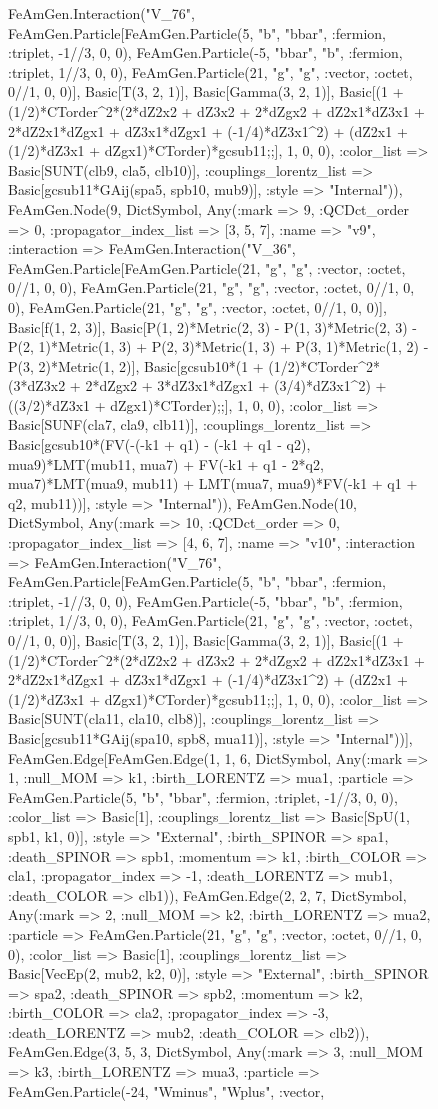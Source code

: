 \documentclass{revtex4}
\begin{document}
\begin{figure}[!htb]
\begin{center}
{FeAmGen.Interaction("V_76", FeAmGen.Particle[FeAmGen.Particle(5, "b", "bbar", :fermion, :triplet, -1//3, 0, 0), FeAmGen.Particle(-5, "bbar", "b", :fermion, :triplet, 1//3, 0, 0), FeAmGen.Particle(21, "g", "g", :vector, :octet, 0//1, 0, 0)], Basic[T(3, 2, 1)], Basic[Gamma(3, 2, 1)], Basic[(1 + (1/2)*CTorder^2*(2*dZ2x2 + dZ3x2 + 2*dZgx2 + dZ2x1*dZ3x1 + 2*dZ2x1*dZgx1 + dZ3x1*dZgx1 + (-1/4)*dZ3x1^2) + (dZ2x1 + (1/2)*dZ3x1 + dZgx1)*CTorder)*gcsub11;;], 1, 0, 0), :color_list => Basic[SUNT(clb9, cla5, clb10)], :couplings_lorentz_list => Basic[gcsub11*GAij(spa5, spb10, mub9)], :style => "Internal")), FeAmGen.Node(9, Dict{Symbol, Any}(:mark => 9, :QCDct_order => 0, :propagator_index_list => [3, 5, 7], :name => "v9", :interaction => FeAmGen.Interaction("V_36", FeAmGen.Particle[FeAmGen.Particle(21, "g", "g", :vector, :octet, 0//1, 0, 0), FeAmGen.Particle(21, "g", "g", :vector, :octet, 0//1, 0, 0), FeAmGen.Particle(21, "g", "g", :vector, :octet, 0//1, 0, 0)], Basic[f(1, 2, 3)], Basic[P(1, 2)*Metric(2, 3) - P(1, 3)*Metric(2, 3) - P(2, 1)*Metric(1, 3) + P(2, 3)*Metric(1, 3) + P(3, 1)*Metric(1, 2) - P(3, 2)*Metric(1, 2)], Basic[gcsub10*(1 + (1/2)*CTorder^2*(3*dZ3x2 + 2*dZgx2 + 3*dZ3x1*dZgx1 + (3/4)*dZ3x1^2) + ((3/2)*dZ3x1 + dZgx1)*CTorder);;], 1, 0, 0), :color_list => Basic[SUNF(cla7, cla9, clb11)], :couplings_lorentz_list => Basic[gcsub10*(FV(-(-k1 + q1) - (-k1 + q1 - q2), mua9)*LMT(mub11, mua7) + FV(-k1 + q1 - 2*q2, mua7)*LMT(mua9, mub11) + LMT(mua7, mua9)*FV(-k1 + q1 + q2, mub11))], :style => "Internal")), FeAmGen.Node(10, Dict{Symbol, Any}(:mark => 10, :QCDct_order => 0, :propagator_index_list => [4, 6, 7], :name => "v10", :interaction => FeAmGen.Interaction("V_76", FeAmGen.Particle[FeAmGen.Particle(5, "b", "bbar", :fermion, :triplet, -1//3, 0, 0), FeAmGen.Particle(-5, "bbar", "b", :fermion, :triplet, 1//3, 0, 0), FeAmGen.Particle(21, "g", "g", :vector, :octet, 0//1, 0, 0)], Basic[T(3, 2, 1)], Basic[Gamma(3, 2, 1)], Basic[(1 + (1/2)*CTorder^2*(2*dZ2x2 + dZ3x2 + 2*dZgx2 + dZ2x1*dZ3x1 + 2*dZ2x1*dZgx1 + dZ3x1*dZgx1 + (-1/4)*dZ3x1^2) + (dZ2x1 + (1/2)*dZ3x1 + dZgx1)*CTorder)*gcsub11;;], 1, 0, 0), :color_list => Basic[SUNT(cla11, cla10, clb8)], :couplings_lorentz_list => Basic[gcsub11*GAij(spa10, spb8, mua11)], :style => "Internal"))], FeAmGen.Edge[FeAmGen.Edge(1, 1, 6, Dict{Symbol, Any}(:mark => 1, :null_MOM => k1, :birth_LORENTZ => mua1, :particle => FeAmGen.Particle(5, "b", "bbar", :fermion, :triplet, -1//3, 0, 0), :color_list => Basic[1], :couplings_lorentz_list => Basic[SpU(1, spb1, k1, 0)], :style => "External", :birth_SPINOR => spa1, :death_SPINOR => spb1, :momentum => k1, :birth_COLOR => cla1, :propagator_index => -1, :death_LORENTZ => mub1, :death_COLOR => clb1)), FeAmGen.Edge(2, 2, 7, Dict{Symbol, Any}(:mark => 2, :null_MOM => k2, :birth_LORENTZ => mua2, :particle => FeAmGen.Particle(21, "g", "g", :vector, :octet, 0//1, 0, 0), :color_list => Basic[1], :couplings_lorentz_list => Basic[VecEp(2, mub2, k2, 0)], :style => "External", :birth_SPINOR => spa2, :death_SPINOR => spb2, :momentum => k2, :birth_COLOR => cla2, :propagator_index => -3, :death_LORENTZ => mub2, :death_COLOR => clb2)), FeAmGen.Edge(3, 5, 3, Dict{Symbol, Any}(:mark => 3, :null_MOM => k3, :birth_LORENTZ => mua3, :particle => FeAmGen.Particle(-24, "Wminus", "Wplus", :vector, }
\end{center}
\end{figure}
\end{document}
